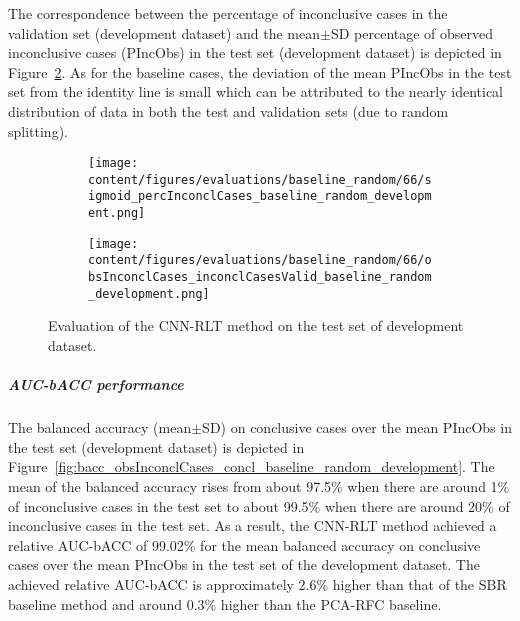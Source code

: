 The correspondence between the percentage of inconclusive cases in the validation set (development dataset) and 
the mean$\pm$SD percentage of observed inconclusive cases (PIncObs) in the test set (development dataset) 
is depicted in Figure~\ref{fig:obsInconclCases_inconclCasesValid_baseline_random_development}.
As for the baseline cases, the deviation of the mean PIncObs in the test set from the 
identity line is small which can be attributed to the nearly identical distribution of data in both the test and validation sets 
(due to random splitting).


\begin{figure}[ht]
  \begin{subfigure}{0.48\textwidth}
    \centering
    \texttt{[image: content/figures/evaluations/baseline\_random/66/sigmoid\_percInconclCases\_baseline\_random\_development.png]}
    \label{fig:baseline_random_percInconclCases_development}
  \end{subfigure}
  \hfill
  \begin{subfigure}{0.495\textwidth}
    \centering
    \texttt{[image: content/figures/evaluations/baseline\_random/66/obsInconclCases\_inconclCasesValid\_baseline\_random\_development.png]}
    \label{fig:obsInconclCases_inconclCasesValid_baseline_random_development}
  \end{subfigure}

  \caption{Evaluation of the CNN-RLT method on the test set of development dataset.}
  \label{fig:eval_cnn_rlt_dev}
\end{figure}


\subparagraph{AUC-bACC performance}

The balanced accuracy (mean$\pm$SD) on conclusive cases over the mean PIncObs in the test set (development dataset) 
is depicted in Figure~\ref{fig:bacc_obsInconclCases_concl_baseline_random_development}.
The mean of the balanced accuracy rises from about 97.5\% 
when there are around 1\% of inconclusive cases in the test set to about 99.5\% 
when there are around 20\% of inconclusive cases in the test set.
As a result, the CNN-RLT method achieved a relative AUC-bACC of 99.02\% for the mean balanced accuracy on conclusive cases
over the mean PIncObs in the test set of the development dataset.
The achieved relative AUC-bACC is approximately 2.6\% higher than that of the SBR baseline method 
and around 0.3\% higher than the PCA-RFC baseline.


